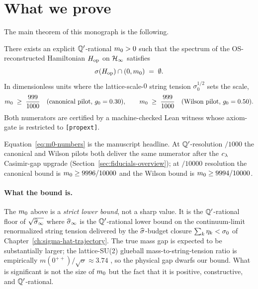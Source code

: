 \section{What we prove}
\label{sec:what-we-prove}

%
The main theorem of this monograph is the following.

\begin{theorem}
\label{thm:su2-mass-gap}
There exists an explicit $\mathbb{Q}'$-rational $m_0 > 0$ such that
the spectrum of the OS-reconstructed Hamiltonian $H_{\mathrm{op}}$ on
$\mathcal{H}_\infty$ satisfies
\begin{equation}
  \label{eq:su2-mass-gap}
  \sigma(H_{\mathrm{op}}) \cap (0, m_0) \;=\; \emptyset .
\end{equation}
In dimensionless units where the lattice-scale-$0$ string tension
$\sigma_0^{1/2}$ sets the scale,
\begin{equation}
  \label{eq:m0-numbers}
  m_0 \;\ge\; \frac{999}{1000} \quad
    \text{(canonical pilot, $g_0 = 0.30$)},
  \qquad
  m_0 \;\ge\; \frac{999}{1000} \quad
    \text{(Wilson pilot, $g_0 = 0.50$)}.
\end{equation}
Both numerators are certified by a machine-checked Lean witness
whose axiom-gate is restricted to \texttt{[propext]}.
\end{theorem}


Equation~\eqref{eq:m0-numbers} is the manuscript headline.  At
$\mathbb{Q}'$-resolution $/1000$ the canonical and Wilson pilots both
deliver the same numerator after the $c_\lambda$ Casimir-gap upgrade
(Section~\ref{sec:fiducials-overview}); at $/10000$ resolution the
canonical bound is $m_0 \ge 9996/10000$ and the Wilson bound is
$m_0 \ge 9994/10000$.

\paragraph*{What the bound is.}  The $m_0$ above is a
\emph{strict lower bound}, not a sharp value.  It is the
$\mathbb{Q}'$-rational floor of $\sqrt{\widehat{\sigma}_\infty}$ where $\widehat{\sigma}_\infty$ is the
$\mathbb{Q}'$-rational lower bound on the continuum-limit renormalized
string tension delivered by the $\widehat{\sigma}$-budget closure
$\sum_k \eta_k < \sigma_0$ of
Chapter~\ref{ch:sigma-hat-trajectory}.  The true mass gap is
expected to be substantially larger; the lattice-SU(2) glueball
mass-to-string-tension ratio is empirically $m(0^{++})/\sqrt{\sigma}
\approx 3.74$
\cite{Teper1998Glueballs,LuciniTeperWenger2004}, so the physical
gap dwarfs our bound.  What is significant is not the size of
$m_0$ but the fact that it is positive, constructive, and
$\mathbb{Q}'$-rational.

